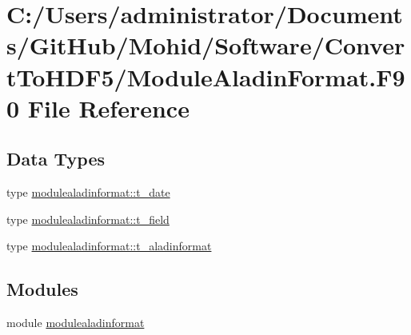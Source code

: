 \hypertarget{_module_aladin_format_8_f90}{}\section{C\+:/\+Users/administrator/\+Documents/\+Git\+Hub/\+Mohid/\+Software/\+Convert\+To\+H\+D\+F5/\+Module\+Aladin\+Format.F90 File Reference}
\label{_module_aladin_format_8_f90}
\subsection*{Data Types}
\begin{DoxyCompactItemize}
\item 
type \mbox{\hyperlink{structmodulealadinformat_1_1t__date}{modulealadinformat\+::t\+\_\+date}}
\item 
type \mbox{\hyperlink{structmodulealadinformat_1_1t__field}{modulealadinformat\+::t\+\_\+field}}
\item 
type \mbox{\hyperlink{structmodulealadinformat_1_1t__aladinformat}{modulealadinformat\+::t\+\_\+aladinformat}}
\end{DoxyCompactItemize}
\subsection*{Modules}
\begin{DoxyCompactItemize}
\item 
module \mbox{\hyperlink{namespacemodulealadinformat}{modulealadinformat}}
\end{DoxyCompactItemize}
